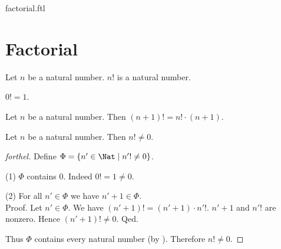 \documentclass{naproche-library}
\begin{document}
\begin{smodule}{factorial.ftl}

  \section*{Factorial}

  \begin{signature}[forthel,id=ARITHMETIC_12_0210357812531785]
    Let $n$ be a natural number.
    $n!$ is a natural number.
  \end{signature}

  \begin{axiom}[forthel,id=ARITHMETIC_12_6945210541236989]
    $0! = 1$.
  \end{axiom}

  \begin{axiom}[forthel,id=ARITHMETIC_12_2312015846987452]
    Let $n$ be a natural number.
    Then $(n + 1)! = n! \cdot (n + 1)$.
  \end{axiom}

  \begin{proposition}[forthel,id=ARITHMETIC_12_6123519005949952]
    Let $n$ be a natural number.
    Then $n! \neq 0$.
  \end{proposition}
  \begin{proof}[forthel]
    Define $\Phi = \{n' \in \Nat \mid n'! \neq 0 \}$.

    (1) $\Phi$ contains $0$.
    Indeed $0! = 1 \neq 0$.

    (2) For all $n' \in \Phi$ we have $n' + 1 \in \Phi$. \\
    Proof.
      Let $n' \in \Phi$.
      We have $(n' + 1)! = (n' + 1) \cdot n'!$.
      $n' + 1$ and $n'!$ are nonzero.
      Hence $(n' + 1)! \neq 0$.
    Qed.

    Thus $\Phi$ contains every natural number (by ).
    Therefore $n! \neq 0$.
  \end{proof}
\end{smodule}
\end{document}
